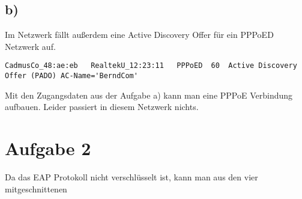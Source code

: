 \documentclass[10pt,a4paper]{article}
\begin{document}
\subsection*{b)}
Im Netzwerk fällt außerdem eine Active Discovery Offer für ein PPPoED Netzwerk auf.
\begin{verbatim}
CadmusCo_48:ae:eb	RealtekU_12:23:11	PPPoED	60	Active Discovery Offer (PADO) AC-Name='BerndCom'
\end{verbatim}
Mit den Zugangsdaten aus der Aufgabe a) kann man eine PPPoE Verbindung aufbauen. Leider passiert in diesem Netzwerk nichts.

\section*{Aufgabe 2}
Da das EAP Protokoll nicht verschlüsselt ist, kann man aus den vier mitgeschnittenen
\end{document}
